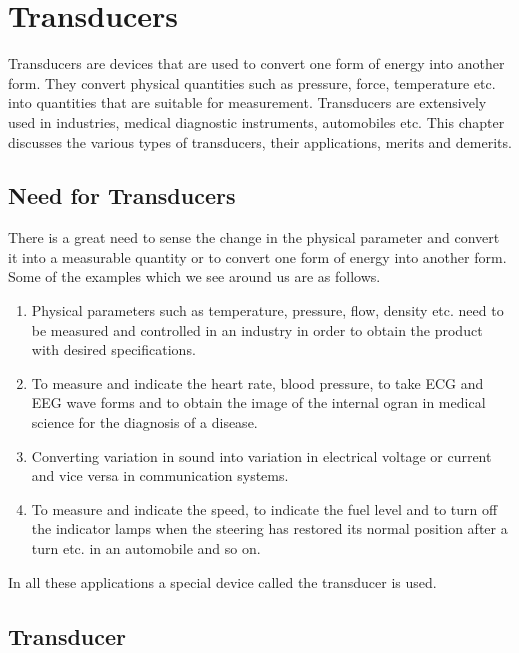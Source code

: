 \chapter{Transducers}\label{chap8}

Transducers are devices that are used to convert one form of energy into another form. They convert physical quantities such as pressure, force, temperature etc. into quantities that are suitable for measurement. Transducers are extensively used in industries, medical diagnostic instruments, automobiles etc. This chapter discusses the various types of transducers, their applications, merits and demerits.

\section{Need for Transducers}\label{sec8.1}

There is a great need to sense the change in the physical parameter and convert it into a measurable quantity or to convert one form of energy into another form. Some of the examples which we see around us are as follows.
\begin{enumerate}
\item Physical parameters such as temperature, pressure, flow, density etc. need to be measured and controlled in an industry in order to obtain the product with desired specifications.

\item To measure and indicate the heart rate, blood pressure, to take ECG and EEG wave forms and to obtain the image of the internal ogran in medical science for the diagnosis of a disease.

\item Converting variation in sound into variation in electrical voltage or current and vice versa in communication systems.

\item To measure and indicate the speed, to indicate the fuel level and to turn off the indicator lamps when the steering has restored its normal position after a turn etc. in an automobile and so on. 
\end{enumerate}

In all these applications a special device called the transducer is used.

\section{Transducer}\label{sec8.2}

